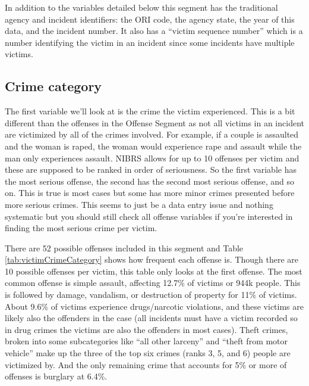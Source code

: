 \documentclass[
  12pt,
  openany]{book}
\begin{document}
In addition to the variables detailed below this segment has the traditional agency and incident identifiers: the ORI code, the agency state, the year of this data, and the incident number. It also has a ``victim sequence number'' which is a number identifying the victim in an incident since some incidents have multiple victims.

\hypertarget{crime-category-1}{%
\subsection{Crime category}\label{crime-category-1}}

The first variable we'll look at is the crime the victim experienced. This is a bit different than the offenses in the Offense Segment as not all victims in an incident are victimized by all of the crimes involved. For example, if a couple is assaulted and the woman is raped, the woman would experience rape and assault while the man only experiences assault. NIBRS allows for up to 10 offenses per victim and these are supposed to be ranked in order of seriousness. So the first variable has the most serious offense, the second has the second most serious offense, and so on. This is true is most cases but some has more minor crimes presented before more serious crimes. This seems to just be a data entry issue and nothing systematic but you should still check all offense variables if you're interested in finding the most serious crime per victim.

There are 52 possible offenses included in this segment and Table \ref{tab:victimCrimeCategory} shows how frequent each offense is. Though there are 10 possible offenses per victim, this table only looks at the first offense. The most common offense is simple assault, affecting 12.7\% of victims or 944k people. This is followed by damage, vandalism, or destruction of property for 11\% of victims. About 9.6\% of victims experience drugs/narcotic violations, and these victims are likely also the offenders in the case (all incidents must have a victim recorded so in drug crimes the victims are also the offenders in most cases). Theft crimes, broken into some subcategories like ``all other larceny'' and ``theft from motor vehicle'' make up the three of the top six crimes (ranks 3, 5, and 6) people are victimized by. And the only remaining crime that accounts for 5\% or more of offenses is burglary at 6.4\%.
\end{document}
